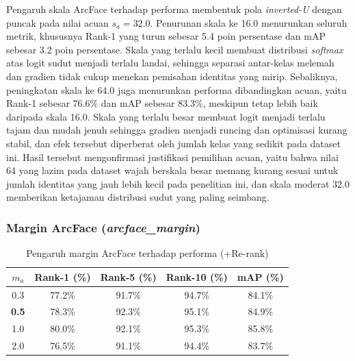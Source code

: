 Pengaruh skala ArcFace terhadap performa membentuk pola \textit{inverted-U} dengan puncak pada nilai acuan $s_a=32{.}0$. Penurunan skala ke 16.0 menurunkan seluruh metrik, khususnya Rank-1 yang turun sebesar 5.4 poin persentase dan mAP sebesar 3.2 poin persentase. Skala yang terlalu kecil membuat distribusi \textit{softmax} atas logit sudut menjadi terlalu landai, sehingga separasi antar-kelas melemah dan gradien tidak cukup menekan pemisahan identitas yang mirip. Sebaliknya, peningkatan skala ke 64.0 juga menurunkan performa dibandingkan acuan, yaitu Rank-1 sebesar 76.6\% dan mAP sebesar 83.3\%, meskipun tetap lebih baik daripada skala 16.0. Skala yang terlalu besar membuat logit menjadi terlalu tajam dan mudah jenuh sehingga gradien menjadi runcing dan optimisasi kurang stabil, dan efek tersebut diperberat oleh jumlah kelas yang sedikit pada dataset ini. Hasil tersebut mengonfirmasi justifikasi pemilihan acuan, yaitu bahwa nilai 64 yang lazim pada dataset wajah berskala besar memang kurang sesuai untuk jumlah identitas yang jauh lebih kecil pada penelitian ini, dan skala moderat 32.0 memberikan ketajaman distribusi sudut yang paling seimbang.

\subsubsection{Margin ArcFace (\textit{arcface\_margin})}

\begin{table}[H]
    \centering
    \caption{Pengaruh margin ArcFace terhadap performa (+Re-rank)}
    \label{tab:var_arcmargin}
    \renewcommand{\arraystretch}{1.25}
    \begin{tabular}{ccccc}
        \hline
        $m_a$          & \textbf{Rank-1 (\%)} & \textbf{Rank-5 (\%)} & \textbf{Rank-10 (\%)} & \textbf{mAP (\%)} \\
        \hline
        0{.}3         & 77.2\%               & 91.7\%               & 94.7\%                & 84.1\%             \\
        \textbf{0{.}5} & 78.3\%               & 92.3\%               & 95.1\%                & 84.9\%            \\
        1{.}0          & 80.0\%               & 92.1\%               & 95.3\%                & 85.8\%            \\
        2{.}0          & 76.5\%               & 91.1\%               & 94.4\%                & 83.7\%            \\
        \hline
    \end{tabular}
\end{table}


